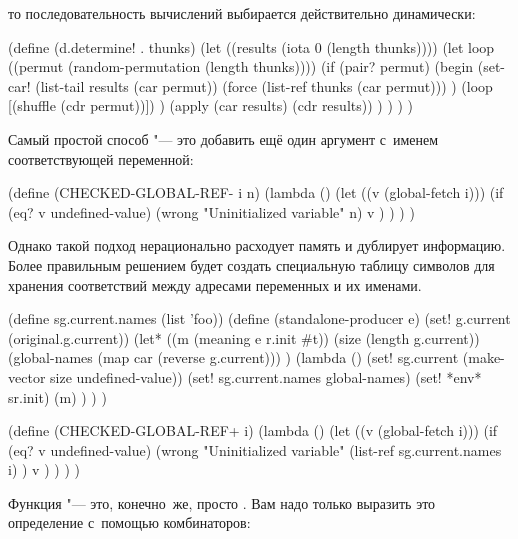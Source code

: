 \noindent
то последовательность вычислений выбирается действительно динамически:

\begin{code:lisp}
(define (d.determine! . thunks)
  (let ((results (iota 0 (length thunks))))
    (let loop ((permut (random-permutation (length thunks))))
      (if (pair? permut)
          (begin (set-car! (list-tail results (car permut))
                           (force (list-ref thunks (car permut))) )
                 (loop [(shuffle (cdr permut))]) )
          (apply (car results) (cdr results)) ) ) ) )
\end{code:lisp}

\endgroup %




Самый простой способ "--- это добавить  ещё один аргумент
с~именем соответствующей переменной:

\begin{code:lisp}
(define (CHECKED-GLOBAL-REF- i n)
  (lambda ()
    (let ((v (global-fetch i)))
      (if (eq? v undefined-value)
          (wrong "Uninitialized variable" n)
          v ) ) ) )
\end{code:lisp}

Однако такой подход нерационально расходует память и дублирует информацию. Более
правильным решением будет создать специальную таблицу символов для хранения
соответствий между адресами переменных и их именами.

\begin{code:lisp}
(define sg.current.names (list 'foo))
(define (standalone-producer e)
  (set! g.current (original.g.current))
  (let* ((m (meaning e r.init #t))
         (size (length g.current))
         (global-names (map car (reverse g.current))) )
    (lambda ()
      (set! sg.current (make-vector size undefined-value))
      (set! sg.current.names global-names)
      (set! *env* sr.init)
      (m) ) ) )

(define (CHECKED-GLOBAL-REF+ i)
  (lambda ()
    (let ((v (global-fetch i)))
      (if (eq? v undefined-value)
          (wrong "Uninitialized variable"
                 (list-ref sg.current.names i) )
          v ) ) ) )
\end{code:lisp}



Функция  "--- это, конечно~же, просто . Вам надо
только выразить это определение с~помощью комбинаторов:

